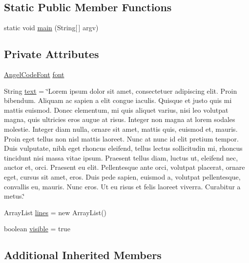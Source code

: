 \subsection*{Static Public Member Functions}
\begin{DoxyCompactItemize}
\item 
static void \mbox{\hyperlink{classorg_1_1newdawn_1_1slick_1_1tests_1_1_font_performance_test_ab323fe3f526a23b1bf728dbaf032a160}{main}} (String\mbox{[}$\,$\mbox{]} argv)
\end{DoxyCompactItemize}
\subsection*{Private Attributes}
\begin{DoxyCompactItemize}
\item 
\mbox{\hyperlink{classorg_1_1newdawn_1_1slick_1_1_angel_code_font}{Angel\+Code\+Font}} \mbox{\hyperlink{classorg_1_1newdawn_1_1slick_1_1tests_1_1_font_performance_test_ad95c36f18e4854afd788ccdec98685d3}{font}}
\item 
String \mbox{\hyperlink{classorg_1_1newdawn_1_1slick_1_1tests_1_1_font_performance_test_a328e2fdc2cb6a5efd2a5c6388329c739}{text}} = \char`\"{}Lorem ipsum dolor sit amet, consectetuer adipiscing elit. Proin bibendum. Aliquam ac sapien a elit congue iaculis. Quisque et justo quis mi mattis euismod. Donec elementum, mi quis aliquet varius, nisi leo volutpat magna, quis ultricies eros augue at risus. Integer non magna at lorem sodales molestie. Integer diam nulla, ornare sit amet, mattis quis, euismod et, mauris. Proin eget tellus non nisl mattis laoreet. Nunc at nunc id elit pretium tempor. Duis vulputate, nibh eget rhoncus eleifend, tellus lectus sollicitudin mi, rhoncus tincidunt nisi massa vitae ipsum. Praesent tellus diam, luctus ut, eleifend nec, auctor et, orci. Praesent eu elit. Pellentesque ante orci, volutpat placerat, ornare eget, cursus sit amet, eros. Duis pede sapien, euismod a, volutpat pellentesque, convallis eu, mauris. Nunc eros. Ut eu risus et felis laoreet viverra. Curabitur a metus.\char`\"{}
\item 
Array\+List \mbox{\hyperlink{classorg_1_1newdawn_1_1slick_1_1tests_1_1_font_performance_test_ac03ca3c0d900997715e7325c76ea0257}{lines}} = new Array\+List()
\item 
boolean \mbox{\hyperlink{classorg_1_1newdawn_1_1slick_1_1tests_1_1_font_performance_test_a1ff056a4500b0f543cee4f88d13dabae}{visible}} = true
\end{DoxyCompactItemize}
\subsection*{Additional Inherited Members}


